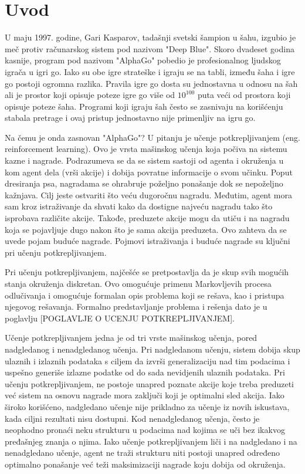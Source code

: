 \chapter{Uvod}



U maju 1997. godine, Gari Kasparov, tadašnji svetski šampion u šahu, izgubio je meč protiv računarskog sistem pod nazivom "Deep Blue". Skoro dvadeset godina kasnije, program pod nazivom "AlphaGo" pobedio je profesionalnog ljudskog igrača u igri go. Iako su obe igre strateške i igraju se na tabli, između šaha i igre go postoji ogromna razlika. Pravila igre go dosta su jednostavna u odnosu na šah ali je prostor koji opisuje poteze igre go više od $10^{100}$ puta veći od prostora koji opisuje poteze šaha. Programi koji igraju šah često se zasnivaju na korišćenju stabala pretrage i ovaj pristup jednostavno nije primenljiv na igru go. \par

Na čemu je onda zasnovan "AlphaGo"? U pitanju je učenje potkrepljivanjem (eng. reinforcement learning). Ovo je vrsta mašinskog učenja koja počiva na sistemu kazne i nagrade. Podrazumeva se da se sistem sastoji od agenta i okruženja u kom agent dela (vrši akcije) i dobija povratne informacije o svom učinku. Poput dresiranja psa, nagradama se ohrabruje poželjno ponašanje dok se nepoželjno kažnjava. Cilj jeste ostvariti što veću dugoročnu nagradu. Međutim, agent mora sam kroz istraživanje da shvati kako da dostigne najveću nagradu tako što isprobava različite akcije. Takođe, preduzete akcije mogu da utiču i na nagradu koja se pojavljuje dugo nakon što je sama akcija preduzeta. Ovo zahteva da se uvede pojam buduće nagrade. Pojmovi istraživanja i buduće nagrade su ključni pri učenju potkrepljivanjem. \par
Pri učenju potkrepljivanjem, najčešće se pretpostavlja da je skup svih mogućih stanja okruženja diskretan. Ovo omogućuje primenu Markovljevih procesa odlučivanja i omogućuje formalan opis problema koji se rešava, kao i pristupa njegovog rešavanja. Formalno predstavljanje problema i rešenja dato je u poglavlju [POGLAVLJE O UCENJU POTKREPLJIVANJEM].

Učenje potkrepljivanjem jedna je od tri vrste mašinskog učenja, pored nadgledanog i nenadgledanog učenja. Pri nadgledanom učenju, sistem dobija skup ulaznih i izlaznih podataka s ciljem da izvrši generalizaciju nad tim podacima i uspešno generiše izlazne podatke od do sada nevidjenih ulaznih podataka. Pri učenju potkrepljivanjem, ne postoje unapred poznate akcije koje treba preduzeti već sistem na osnovu nagrade mora zaključi koji je optimalni sled akcija. Iako široko korišćeno, nadgledano učenje nije prikladno za učenje iz novih iskustava, kada ciljni rezultati nisu dostupni.  Kod nenadgledanog učenja, često je neophodno pronaći neku strukturu u podacima nad kojima se uči bez ikakvog pređašnjeg znanja o njima. Iako učenje potkrepljivanjem liči i na nadgledano i na nenadgledano učenje, agent ne traži strukturu niti postoji unapred određeno optimalno ponašanje već teži maksimizaciji nagrade koju dobija od okruženja. \par

